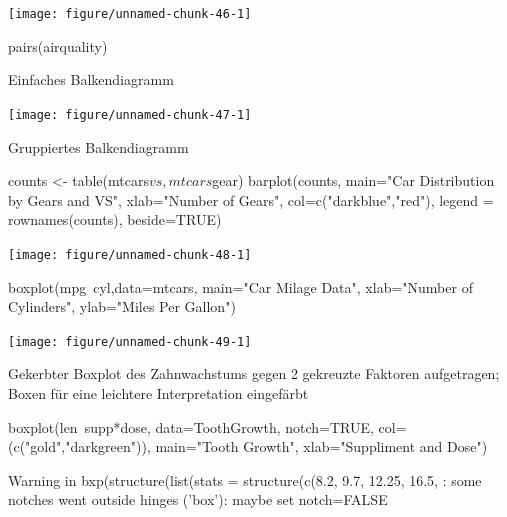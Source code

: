 \documentclass[a4paper,twoside]{tufte-book}\usepackage[]{graphicx}\usepackage[]{color}
\begin{document}
\begin{appendices}
\begin{Schunk}
{\centering \texttt{[image: figure/unnamed-chunk-46-1]} 

}

\end{Schunk}


pairs(airquality)


Einfaches Balkendiagramm

\begin{Schunk}


{\centering \texttt{[image: figure/unnamed-chunk-47-1]} 

}

\end{Schunk}

Gruppiertes Balkendiagramm

\begin{Schunk}
\begin{Sinput}
counts <- table(mtcars$vs, mtcars$gear)
barplot(counts, main="Car Distribution by Gears and VS",
  xlab="Number of Gears", col=c("darkblue","red"),
  legend = rownames(counts), beside=TRUE)
\end{Sinput}


{\centering \texttt{[image: figure/unnamed-chunk-48-1]} 

}

\end{Schunk}


\begin{Schunk}
\begin{Sinput}
boxplot(mpg~cyl,data=mtcars, main="Car Milage Data", 
   xlab="Number of Cylinders", ylab="Miles Per Gallon")
\end{Sinput}


{\centering \texttt{[image: figure/unnamed-chunk-49-1]} 

}

\end{Schunk}


Gekerbter Boxplot des Zahnwachstums gegen 2 gekreuzte Faktoren aufgetragen;
Boxen für eine leichtere Interpretation eingefärbt

\begin{Schunk}
\begin{Sinput}
boxplot(len~supp*dose, data=ToothGrowth, notch=TRUE, 
  col=(c("gold","darkgreen")),
  main="Tooth Growth", xlab="Suppliment and Dose")
\end{Sinput}
\begin{Soutput}
Warning in bxp(structure(list(stats = structure(c(8.2, 9.7, 12.25, 16.5, : some notches went outside hinges ('box'): maybe set notch=FALSE
\end{Soutput}



\end{Schunk}
\end{appendices}
\end{document}
